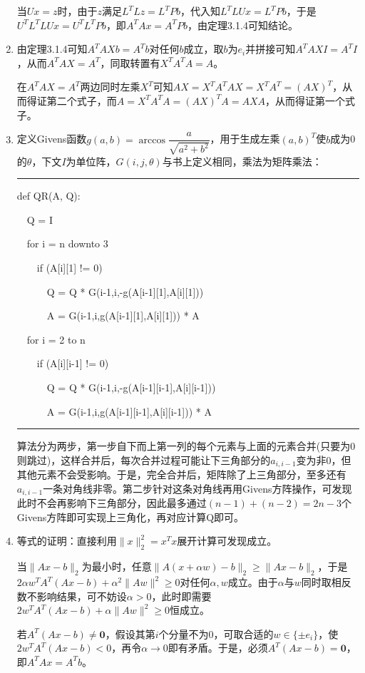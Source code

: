 \documentclass[a4paper,UTF8,fontset=windows]{ctexart}
\newenvironment{code}{\rule{36em}{0.1em}\setlength{\parindent}{1em}\setmainfont{Consolas}

}{

\setlength{\parindent}{0em}\rule{36em}{0.1em}}
\begin{document}
\begin{enumerate}
当$Ux=z$时，由于$z$满足$L^TLz=L^TPb$，代入知$L^TLUx=L^TPb$，于是$U^TL^TLUx=U^TL^TPb$，即$A^TAx=A^TPb$，由定理3.1.4可知结论。

\item
由定理3.1.4可知$A^TAXb=A^Tb$对任何$b$成立，取$b$为$e_i$并拼接可知$A^TAXI=A^TI$，从而$A^TAX=A^T$，同取转置有$X^TA^TA=A$。

在$A^TAX=A^T$两边同时左乘$X^T$可知$AX=X^TA^TAX=X^TA^T=(AX)^T$，从而得证第二个式子，而$A=X^TA^TA=(AX)^TA=AXA$，从而得证第一个式子。

\item

定义Givens函数$g(a,b)=\arccos\dfrac{a}{\sqrt{a^2+b^2}}$，用于生成左乘$(a,b)^T$使$b$成为0的$\theta$，下文$I$为单位阵，$G(i,j,\theta)$与书上定义相同，乘法为矩阵乘法：

\begin{code}
def QR(A, Q):

\ \ Q = I

\ \ for i = n downto 3

\ \ \ \ if (A[i][1] != 0)

\ \ \ \ \ \ Q = Q * G(i-1,i,-g(A[i-1][1],A[i][1]))

\ \ \ \ \ \ A = G(i-1,i,g(A[i-1][1],A[i][1])) * A

\ \ for i = 2 to n

\ \ \ \ if (A[i][i-1] != 0)

\ \ \ \ \ \ Q = Q * G(i-1,i,-g(A[i-1][i-1],A[i][i-1]))

\ \ \ \ \ \ A = G(i-1,i,g(A[i-1][i-1],A[i][i-1])) * A
\end{code}

算法分为两步，第一步自下而上第一列的每个元素与上面的元素合并(只要为0则跳过)，这样合并后，每次合并过程可能让下三角部分的$a_{i,i-1}$变为非0，但其他元素不会受影响。于是，完全合并后，矩阵除了上三角部分，至多还有$a_{i,i-1}$一条对角线非零。第二步针对这条对角线再用Givens方阵操作，可发现此时不会再影响下三角部分，因此最多通过$(n-1)+(n-2)=2n-3$个Givens方阵即可实现上三角化，再对应计算Q即可。

\item
等式的证明：直接利用$\|x\|_2^2=x^Tx$展开计算可发现成立。

当$\|Ax-b\|_2$为最小时，任意$\|A(x+\alpha w)-b\|_2\ge\|Ax-b\|_2$，于是$2\alpha w^TA^T(Ax-b)+\alpha^2\|Aw\|^2\ge0$对任何$\alpha,w$成立。由于$\alpha$与$w$同时取相反数不影响结果，可不妨设$\alpha>0$，此时即需要$2w^TA^T(Ax-b)+\alpha\|Aw\|^2\ge0$恒成立。

若$A^T(Ax-b)\ne\mathbf{0}$，假设其第$i$个分量不为0，可取合适的$w\in\{\pm e_i\}$，使$2w^TA^T(Ax-b)<0$，再令$\alpha\to0$即有矛盾。于是，必须$A^T(Ax-b)=\mathbf{0}$，即$A^TAx=A^Tb$。
\end{enumerate}
\end{document}
